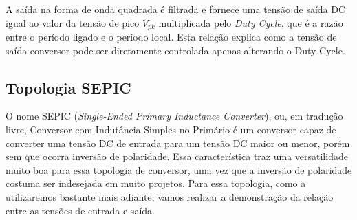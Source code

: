 A saída na forma de onda quadrada é filtrada e fornece uma tensão de saída DC igual ao valor da tensão de pico $V_{pk}$ multiplicada pelo \textit{Duty Cycle}, que é a razão entre o período ligado e o período local. Esta relação explica como a tensão de saída conversor pode ser diretamente controlada apenas alterando o Duty Cycle.  

\subsection*{Topologia SEPIC}
O nome SEPIC (\textit{Single-Ended Primary Inductance Converter}), ou, em tradução livre, Conversor com Indutância Simples no Primário é um conversor capaz de converter uma tensão DC de entrada para um tensão DC maior ou menor, porém sem que ocorra inversão de polaridade. Essa característica traz uma versatilidade muito boa para essa topologia de conversor, uma vez que a inversão de polaridade costuma ser indesejada em muito projetos.  Para essa topologia, como a utilizaremos bastante mais adiante, vamos realizar a demonstração da relação entre as tensões de entrada e saída.   

\noindent
\begin{minipage}{\linewidth}
\label{sepic_topology_sample}
\end{minipage}

